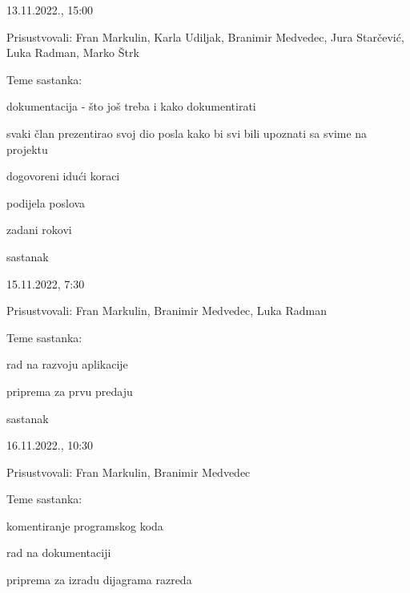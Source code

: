 \begin{packed_enum}
			\item[] \begin{packed_item}
				\item 13.11.2022., 15:00
				\item Prisustvovali: Fran Markulin, Karla Udiljak, Branimir Medvedec, Jura Starčević, Luka Radman, Marko Štrk
				\item Teme sastanka: 
				\begin{packed_item}
					\item  dokumentacija - što još treba i kako dokumentirati
					\item svaki član prezentirao svoj dio posla kako bi svi bili upoznati sa svime na projektu
					\item dogovoreni idući koraci
					\item podijela poslova
					\item zadani rokovi
				\end{packed_item}
			\end{packed_item}

			\item  sastanak
			
			\item[] \begin{packed_item}
				\item 15.11.2022, 7:30
				\item Prisustvovali: Fran Markulin, Branimir Medvedec, Luka Radman
				\item Teme sastanka: 
				\begin{packed_item}
					\item  rad na razvoju aplikacije
					\item priprema za prvu predaju
				\end{packed_item}
			\end{packed_item}

			\item  sastanak
			
			\item[] \begin{packed_item}
				\item 16.11.2022., 10:30
				\item Prisustvovali: Fran Markulin, Branimir Medvedec
				\item Teme sastanka: 
				\begin{packed_item}
					\item  komentiranje programskog koda
					\item rad na dokumentaciji
					\item priprema za izradu dijagrama razreda
				\end{packed_item}
			\end{packed_item}
			
			
		\end{packed_enum}
		
